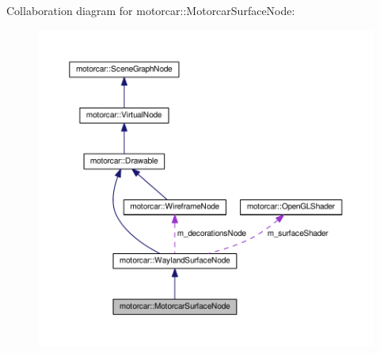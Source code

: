 Collaboration diagram for motorcar\-:\-:Motorcar\-Surface\-Node\-:
\nopagebreak
\begin{figure}[H]
\begin{center}
\leavevmode
\includegraphics[width=350pt]{classmotorcar_1_1MotorcarSurfaceNode__coll__graph}
\end{center}
\end{figure}

